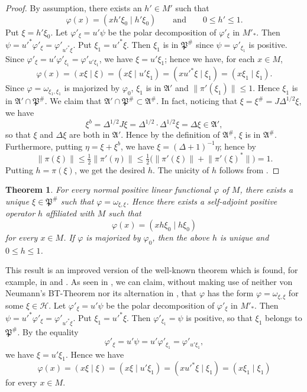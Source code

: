 \documentclass[12pt,b5paper,twoside]{article}
\theoremstyle{takesaki}
\newtheorem{theorem}{Theorem}[section]
\numberwithin{equation}{section}
\begin{document}
\begin{proof}
By assumption, there exists an $h'\in M'$ such that
\[
  \varphi(x)=(xh'\xi_0\mid h'\xi_0)
  \qquad\text{and}\qquad 0\leq h'\leq1.
\]
Put $\xi=h'\xi_0$.  Let $\varphi'_{\xi}=u'\psi$ be the polar
decomposition of $\varphi'_{\xi}$ in $M'_*$.  Then
$\psi=u'^*\varphi'_{\xi}=\varphi'_{u'^*\xi}$.  Put
$\xi_1=u'^*\xi$.  Then $\xi_1$ is in $\mathfrak P^{\#}$ since
$\psi=\varphi'_{\xi_1}$ is positive.  Since
$\varphi'_{\xi}=u'\varphi'_{\xi_1}=\varphi'_{u'\xi_1}$, we have
$\xi=u'\xi_1$; hence we have, for each $x\in M$,
\[
  \varphi(x)=(x\xi\mid\xi)
  =(x\xi\mid u'\xi_1)
  =(xu'^*\xi\mid\xi_1)
  =(x\xi_1\mid\xi_1).
\]
Since $\varphi=\omega_{\xi_1,\xi_1}$ is majorized by $\varphi_0$,
$\xi_1$ is in $\mathfrak A'$ and $\lVert\pi'(\xi_1)\rVert\leq1$.
Hence $\xi_1$ is in $\mathfrak A'\cap\mathfrak P^{\#}$.  We claim that
$\mathfrak A'\cap\mathfrak P^{\#}\subset\mathfrak A^{\#}$.  In fact,
noticing that $\xi=\xi^{\#}=J\Delta^{1/2}\xi$, we have
\[
  \xi^{b}=\Delta^{1/2}J\xi
  =\Delta^{1/2}\cdot\Delta^{1/2}\xi
  =\Delta\xi\in\mathfrak A',
\]
so that $\xi$ and $\Delta\xi$ are both in $\mathfrak A'$.  Hence by the
definition of $\mathfrak A^{\#}$, $\xi$ is in $\mathfrak A^{\#}$.
Furthermore, putting $\eta=\xi+\xi^{b}$, we have
$\xi=(\Delta+1)^{-1}\eta$; hence by 
\[
  \lVert\pi(\xi)\rVert
  \leq\tfrac12\lVert\pi'(\eta)\rVert
  \leq\tfrac12\bigl(\lVert\pi'(\xi)\rVert
    +\lVert\pi'(\xi)^*\rVert\bigr)=1.
\]
Putting $h=\pi(\xi)$, we get the desired $h$.  The unicity of $h$
follows from .
\end{proof}

\begin{theorem}
\label{thm:15.1}
For every normal positive linear functional $\varphi$ of $M$, there
exists a unique $\xi\in\mathfrak P^{\#}$ such that
$\varphi=\omega_{\xi,\xi}$.  Hence there exists a self-adjoint positive
operator $h$ affiliated with $M$ such that
\[
  \varphi(x)=(xh\xi_0\mid h\xi_0)
\]
for every $x\in M$.  If $\varphi$ is majorized by $\varphi_0$, then the
above $h$ is unique and $0\leq h\leq1$.
\end{theorem}

This result is an improved version of the well-known theorem which is
found, for example, in \cite[Theorem~4, p.~222]{ref3} and \cite{ref23}.
As seen in \cite{ref23}, we can claim, without making use of neither
von Neumann's BT-Theorem nor its alternation in
\cite[Lemma~3, p.~220]{ref3}, that $\varphi$ has the form
$\varphi=\omega_{\xi,\xi}$ for some $\xi\in\mathcal H$.  Let
$\varphi'_{\xi}=u'\psi$ be the polar decomposition of $\varphi'_{\xi}$
in $M'_*$.  Then $\psi=u'^*\varphi'_{\xi}=\varphi'_{u'^*\xi}$.  Put
$\xi_1=u'^*\xi$.  Then $\varphi'_{\xi_1}=\psi$ is positive, so that
$\xi_1$ belongs to $\mathfrak P^{\#}$.  By the equality
\[
  \varphi'_{\xi}=u'\psi=u'\varphi'_{\xi_1}=\varphi'_{u'\xi_1},
\]
we have $\xi=u'\xi_1$.  Hence we have
\[
  \varphi(x)=(x\xi\mid\xi)
  =(x\xi\mid u'\xi_1)
  =(xu'^*\xi\mid\xi_1)
  =(x\xi_1\mid\xi_1)
\]
for every $x\in M$.
\end{document}
